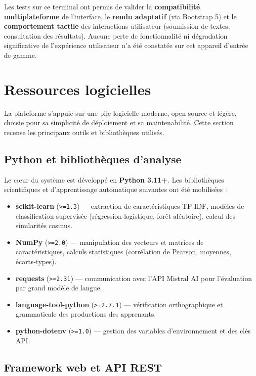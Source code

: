 Les tests sur ce terminal ont permis de valider la \textbf{compatibilité multiplateforme} de l'interface, le \textbf{rendu adaptatif} (via Bootstrap 5) et le \textbf{comportement tactile} des interactions utilisateur (soumission de textes, consultation des résultats). Aucune perte de fonctionnalité ni dégradation significative de l'expérience utilisateur n'a été constatée sur cet appareil d'entrée de gamme.

\section{Ressources logicielles}

La plateforme \AZIZA{} s'appuie sur une pile logicielle moderne, open source et légère, choisie pour sa simplicité de déploiement et sa maintenabilité. Cette section recense les principaux outils et bibliothèques utilisés.

\subsection{Python et bibliothèques d'analyse}

Le cœur du système est développé en \textbf{Python 3.11+}. Les bibliothèques scientifiques et d'apprentissage automatique suivantes ont été mobilisées :

\begin{itemize}
    \item \textbf{scikit-learn} (\texttt{>=1.3}) — extraction de caractéristiques TF-IDF, modèles de classification supervisée (régression logistique, forêt aléatoire), calcul des similarités cosinus.
    \item \textbf{NumPy} (\texttt{>=2.0}) — manipulation des vecteurs et matrices de caractéristiques, calculs statistiques (corrélation de Pearson, moyennes, écarts-types).
    \item \textbf{requests} (\texttt{>=2.31}) — communication avec l'API Mistral AI pour l'évaluation par grand modèle de langue.
    \item \textbf{language-tool-python} (\texttt{>=2.7.1}) — vérification orthographique et grammaticale des productions des apprenants.
    \item \textbf{python-dotenv} (\texttt{>=1.0}) — gestion des variables d'environnement et des clés API.
\end{itemize}

\subsection{Framework web et API REST}

